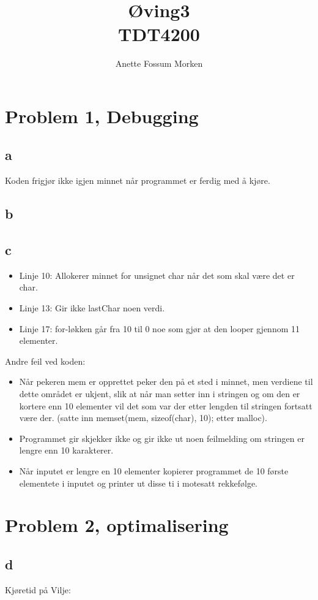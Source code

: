 \documentclass[12pt, a4paper]{article} %
\title{Øving3\\ TDT4200}
\author[1]{Anette Fossum Morken}
\date{}
\begin{document}
\maketitle
\section*{Problem 1, Debugging}
\subsection*{a}
Koden frigjør ikke igjen minnet når programmet er ferdig med å kjøre.

\subsection*{b}

\subsection*{c}

\begin{itemize}
\item Linje 10: Allokerer minnet for unsignet char når det som skal være det er char.
\item Linje 13: Gir ikke lastChar noen verdi.
\item Linje 17: for-løkken går fra 10 til 0 noe som gjør at den looper gjennom 11 elementer.
\end{itemize}
Andre feil ved koden:
\begin{itemize}
\item Når pekeren mem er opprettet peker den på et sted i minnet, men verdiene til dette området er ukjent, slik at når man setter inn i stringen og om den er kortere enn 10 elementer vil det som var der etter lengden til stringen fortsatt være der. (satte inn memset(mem, sizeof(char), 10); etter malloc).
\item Programmet gir skjekker ikke og gir ikke ut noen feilmelding om stringen er lengre enn 10 karakterer.
\item Når inputet er lengre en 10 elementer kopierer programmet de 10 første elementete i inputet og printer ut disse ti i motesatt rekkefølge.
\end{itemize}
\section*{Problem 2, optimalisering}

\subsection*{d}
Kjøretid på Vilje:
\end{document}
